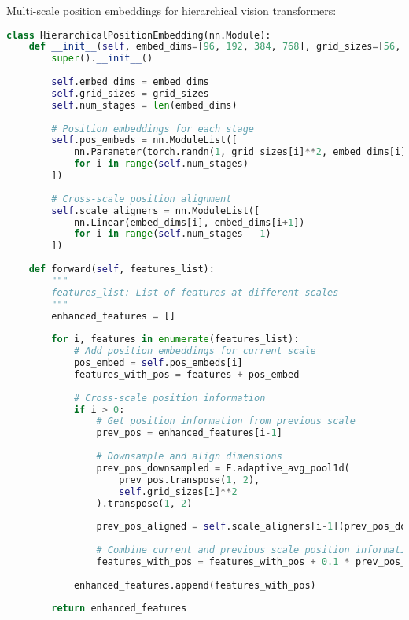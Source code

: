 Multi-scale position embeddings for hierarchical vision transformers:

\begin{lstlisting}[language=Python, caption=Hierarchical position embeddings]
class HierarchicalPositionEmbedding(nn.Module):
    def __init__(self, embed_dims=[96, 192, 384, 768], grid_sizes=[56, 28, 14, 7]):
        super().__init__()
        
        self.embed_dims = embed_dims
        self.grid_sizes = grid_sizes
        self.num_stages = len(embed_dims)
        
        # Position embeddings for each stage
        self.pos_embeds = nn.ModuleList([
            nn.Parameter(torch.randn(1, grid_sizes[i]**2, embed_dims[i]) * 0.02)
            for i in range(self.num_stages)
        ])
        
        # Cross-scale position alignment
        self.scale_aligners = nn.ModuleList([
            nn.Linear(embed_dims[i], embed_dims[i+1])
            for i in range(self.num_stages - 1)
        ])
    
    def forward(self, features_list):
        """
        features_list: List of features at different scales
        """
        enhanced_features = []
        
        for i, features in enumerate(features_list):
            # Add position embeddings for current scale
            pos_embed = self.pos_embeds[i]
            features_with_pos = features + pos_embed
            
            # Cross-scale position information
            if i > 0:
                # Get position information from previous scale
                prev_pos = enhanced_features[i-1]
                
                # Downsample and align dimensions
                prev_pos_downsampled = F.adaptive_avg_pool1d(
                    prev_pos.transpose(1, 2), 
                    self.grid_sizes[i]**2
                ).transpose(1, 2)
                
                prev_pos_aligned = self.scale_aligners[i-1](prev_pos_downsampled)
                
                # Combine current and previous scale position information
                features_with_pos = features_with_pos + 0.1 * prev_pos_aligned
            
            enhanced_features.append(features_with_pos)
        
        return enhanced_features
\end{lstlisting}

